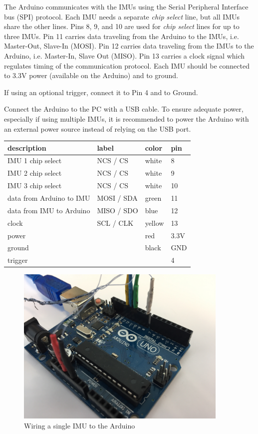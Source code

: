 \documentclass[11pt,letterpaper,article,oneside]{memoir}
\begin{document}
The Arduino communicates with the IMUs using the Serial Peripheral Interface bus
(SPI) protocol. Each IMU needs a separate \emph{chip select} line, but all IMUs
share the other lines. Pins 8, 9, and 10 are used for \emph{chip select} lines
for up to three IMUs. Pin 11 carries data traveling from the Arduino to the IMUs,
i.e. Master-Out, Slave-In (MOSI). Pin 12 carries data traveling from the IMUs to
the Arduino, i.e. Master-In, Slave Out (MISO). Pin 13 carries a clock signal
which regulates timing of the communication protocol.  Each IMU should be
connected to 3.3V power (available on the Arduino) and to ground.

If using an optional trigger, connect it to Pin 4 and to Ground.

Connect the Arduino to the PC with a USB cable.  To ensure adequate power,
especially if using multiple IMUs, it is recommended to power the Arduino with
an external power source instead of relying on the USB port.

\begin{table}
\centering
\begin{tabular}{@{}*4l@{}}
\toprule
description & label & color & pin \\
\midrule 
IMU 1 chip select & NCS / CS & white & 8 \\
IMU 2 chip select & NCS / CS & white & 9 \\
IMU 3 chip select & NCS / CS & white & 10 \\
data from Arduino to IMU & MOSI / SDA & green & 11 \\
data from IMU to Arduino & MISO / SDO & blue & 12 \\
clock & SCL / CLK & yellow & 13 \\
power &  & red & 3.3V \\
ground &  & black & GND \\
trigger &  &  & 4 \\
\bottomrule
\end{tabular}
\label{tab:wiring}
\end{table}

\begin{figure}[]
    \begin{center}
        \includegraphics[height=3in]{wiring2}
    \end{center}
    \caption{Wiring a single IMU to the Arduino}
\end{figure}
\end{document}
